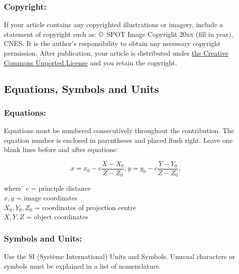 \documentclass{isprs} %
\begin{document}
\subsubsection{Copyright:}\label{sec:Copyright}

If your article contains any copyrighted illustrations or imagery, 
include a statement of copyright such as: \copyright~SPOT Image Copyright 20xx 
(fill in year), CNES\@. It is the author's responsibility to obtain any necessary 
copyright permission. After publication, your article is distributed under \underline{the Creative 
Commons Unported License} and you retain the copyright.

\subsection{Equations, Symbols and Units}\label{sec:Equations, Symbols and Units}

\subsubsection{Equations:}\label{sec:Equations}

Equations must be numbered consecutively throughout the contribution. The equation 
number is enclosed in parentheses and placed flush right. Leave one blank lines 
before and after equations: 


\begin{equation}\label{equ:1}
	x = x_0 -c \frac{X - X_0}{Z - Z_0}; y = y_0 -c \frac{Y - Y_0}{Z - Z_0},
\end{equation}

\begin{tabbing} 
where \hspace{0.6cm} \= $c$ = principle distance\\
\> $x,y$ = image coordinates\\
\> $X_0,Y_0, Z_0$ = coordinates of projection centre\\
\> $X, Y, Z$ = object coordinates
\end{tabbing}

\subsubsection{Symbols and Units:}\label{sec:Symbols and Units}
Use the SI (Syst\`{e}me International) Units and Symbols. Unusual characters 
or symbols must be explained in a list of nomenclature.

\end{document}
